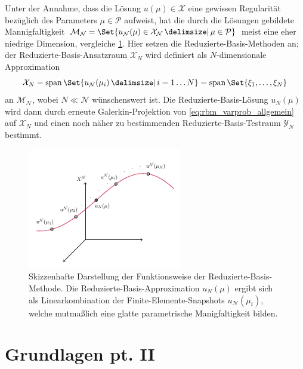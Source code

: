 \documentclass[../main.tex]{subfiles}
\begin{document}
Unter der Annahme, dass die Lösung $u(\mu) \in \mathcal X$ eine gewissen Regularität bezüglich des Parameters $\mu \in \mathcal P$ aufweist, hat die durch die Lösungen gebildete Mannigfaltigkeit $\mathcal M_{\mathcal N} = \Set{u_{\mathcal N}(\mu) \in \mathcal X_{\mathcal N} \given \mu \in \mathcal P}$ meist eine eher niedrige Dimension, vergleiche \cref{fig:figure1}.
Hier setzen die Reduzierte-Basis-Methoden an; der Reduzierte-Basis-Ansatzraum $\mathcal X_{N}$ wird definiert als $N$-dimensionale Approximation
\begin{equation}
    \mathcal X_{N} = \spn\Set{u_{\mathcal N}(\mu_{i}) \given i = 1 \dots N} = \spn\Set{\xi_{1}, \dots, \xi_{N}}
\end{equation}
an $\mathcal M_{\mathcal N}$, wobei $N \ll \mathcal N$ wünschenswert ist.
Die Reduzierte-Basis-Lösung $u_{N}(\mu)$ wird dann durch erneute Galerkin-Projektion von \cref{eq:rbm_varprob_allgemein} auf $\mathcal X_{N}$ und einen noch näher zu bestimmenden Reduzierte-Basis-Testraum $\mathcal Y_{N}$ bestimmt.

\begin{figure}[tb]
    \centering
    \includegraphics[width=0.6\textwidth]{figures/rb.pdf}
    \caption[%
    Skizze zur Motivation der Reduzierte-Basis-Methode.
    ]{
        Skizzenhafte Darstellung der Funktionsweise der Reduzierte-Basis-Methode.
        Die Reduzierte-Basis-Approximation $u_{N}(\mu)$ ergibt sich als Linearkombination der Finite-Elemente-Snapshots $u_{\mathcal N}(\mu_{i})$, welche mutmaßlich eine glatte parametrische Manigfaltigkeit bilden.
        }
    \label{fig:figure1}
\end{figure}


\section{Grundlagen pt. II} %
\label{sec:grundlagen}
\end{document}
